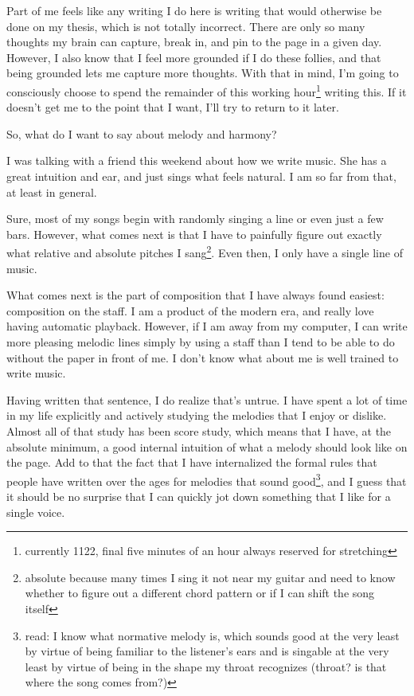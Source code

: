 \documentclass[12pt]{article}
\renewcommand{\,}{\textsuperscript{,}}
\begin{document}
Part of me feels like any writing I do here is writing that would otherwise be done on my thesis, which is not totally incorrect.  
There are only so many thoughts my brain can capture, break in, and pin to the page in a given day.  
However, I also know that I feel more grounded if I do these follies, and that being grounded lets me capture more thoughts.  
With that in mind, I'm going to consciously choose to spend the remainder of this working hour\footnote{currently 1122, final five minutes of an hour always reserved for stretching} writing this.  
If it doesn't get me to the point that I want, I'll try to return to it later.

So, what do I want to say about melody and harmony?

I was talking with a friend this weekend about how we write music.  
She has a great intuition and ear, and just sings what feels natural.  
I am so far from that, at least in general.

Sure, most of my songs begin with randomly singing a line or even just a few bars.  
However, what comes next is that I have to painfully figure out exactly what relative and absolute pitches I sang\footnote{absolute because many times I sing it not near my guitar and need to know whether to figure out a different chord pattern or if I can shift the song itself}.  
Even then, I only have a single line of music.

What comes next is the part of composition that I have always found easiest: composition on the staff.  
I am a product of the modern era, and really love having automatic playback.  
However, if I am away from my computer, I can write more pleasing melodic lines simply by using a staff than I tend to be able to do without the paper in front of me.  
I don't know what about me is well trained to write music.

Having written that sentence, I do realize that's untrue.  
I have spent a lot of time in my life explicitly and actively studying the melodies that I enjoy or dislike.  
Almost all of that study has been score study, which means that I have, at the absolute minimum, a good internal intuition of what a melody should look like on the page.  
Add to that the fact that I have internalized the formal rules that people have written over the ages for melodies that sound good\footnote{read: I know what normative melody is, which sounds good at the very least by virtue of being familiar to the listener's ears and is singable at the very least by virtue of being in the shape my throat recognizes (throat? is that where the song comes from?)}, and I guess that it should be no surprise that I can quickly jot down something that I like for a single voice.
\end{document}
